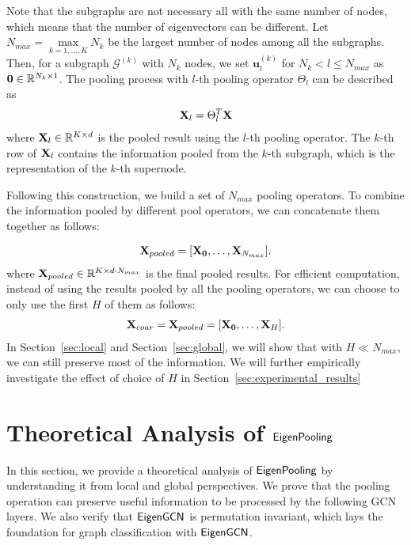 \documentclass[sigconf]{acmart}
\newcommand{\m}{{\sf {EigenGCN}}}
\newcommand{\pooling}{{\sf {EigenPooling}}}
\begin{document}
Note that the subgraphs are not necessary all with the same number of nodes, which means that the number of eigenvectors can be different. Let $N_{max} = \max\limits_{k=1,\dots,K} N_k$ be the largest number of nodes among all the subgraphs. Then, for a subgraph $\mathcal{G}^{(k)}$ with $N_k$ nodes, we set $\mathbf{u}^{(k)}_{l}$ for $N_k < l \leq  N_{max}$ as ${\bf 0} \in \mathbb{R}^{N_k\times 1}$. The pooling process with $l$-th pooling operator $\Theta_l$ can be described as
\begin{align} \label{eq:X_l}
    {\bf X}_l = \Theta_l^T{\bf X} 
\end{align}
where ${\bf X}_l\in \mathbb{R}^{K\times d}$ is the pooled result using the $l$-th pooling operator. The $k$-th row of ${\bf X}_l$ contains the information pooled from the $k$-th subgraph, which is the representation of the $k$-th supernode. 

Following this construction, we build a set of $N_{max}$ pooling operators. To combine the information pooled by different pool operators, we can concatenate them together as follows: 

\begin{align}
    {\bf X}_{pooled} = [{\bf X_0}, \dots,{\bf X}_{N_{max}}].
\end{align}
where ${\bf X}_{pooled} \in \mathbb{R}^{K\times d\cdot N_{max}}$ is the final pooled results. 
For efficient computation, instead of using the results pooled by all the pooling operators, we can choose to only use the first $H$ of them as follows: 
\begin{align}
    {\bf X}_{coar}={\bf X}_{pooled} = [{\bf X_0}, \dots,{\bf X}_{H}].
\end{align}
In Section~\ref{sec:local} and Section~\ref{sec:global}, we will show that with $H \ll N_{max}$, we can still preserve most of the information. We will further empirically investigate the effect of choice of $H$ in Section~\ref{sec:experimental_results}






\section{Theoretical Analysis of $\pooling$} \label{sec:theoretical}
In this section, we provide a theoretical analysis of $\pooling$ by understanding it from local and global perspectives. 
We prove that the pooling operation can preserve useful information to be processed by the following GCN layers. We also verify that $\m$ is permutation invariant, which lays the foundation for graph classification with $\m$.
\end{document}
